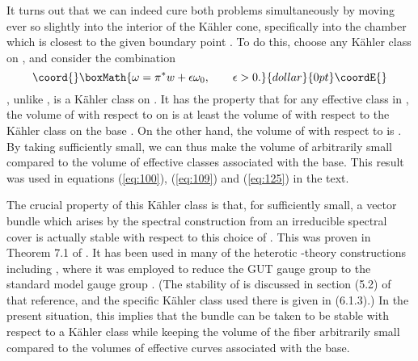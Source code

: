 \documentclass[a4paper,12pt]{article}
\numberwithin{equation}{section}
\theoremstyle{plain}
\begin{document}
It turns out that we can indeed cure both problems simultaneously by 
moving ever so slightly into the interior of the K\"{a}hler cone, specifically 
into the chamber which is closest to the 
given boundary point \coordHE{}. To do this,
choose any K\"{a}hler class \coordHE{} on \coordHE{}, and consider the combination 
$$\coord{}\boxMath{ \omega = {\pi}^*w + {\epsilon} \omega_0, \qquad {\epsilon} > 0. }{dollar}{0pt}\coordE{}$$  \myHighlight{$\omega$}\coordHE{}, unlike \coordHE{}, is a K\"{a}hler class on \coordHE{}. 
It has the property that for any
effective class \coordHE{} in \coordHE{}, the volume of 
\coordHE{} with respect to \myHighlight{$\omega$}\coordHE{} on \coordHE{} 
is at least the volume of \coordHE{} with respect to the
K\"{a}hler class \coordHE{} on the base \coordHE{}. On the other hand, the volume of \coordHE{} 
with respect to \myHighlight{$\omega$}\coordHE{} is \coordHE{}. 
By taking \myHighlight{$\epsilon$}\coordHE{}
sufficiently small, we can thus make the volume of \coordHE{} arbitrarily small
compared to the volume of effective classes associated with the base. This result
was used in equations (\ref{eq:100}), (\ref{eq:109}) and (\ref{eq:125}) in the
text.

The crucial property of this K\"{a}hler class \myHighlight{$\omega$}\coordHE{} is that, for
\myHighlight{$\epsilon$}\coordHE{} sufficiently small, a vector bundle \coordHE{} which arises by the spectral
construction from an irreducible spectral cover is actually stable with
respect to this choice of \myHighlight{$\omega$}\coordHE{}. This was proven in Theorem 7.1 of
\cite{FMW2}. It has been used in many of the heterotic \coordHE{}-theory constructions 
including \cite{RD3}, where it was employed to reduce the GUT gauge 
group \coordHE{} to the standard model gauge group \coordHE{}. (The stability 
of \coordHE{} is discussed in section (5.2) of that reference, and the specific 
K\"{a}hler class \myHighlight{$\omega$}\coordHE{} used there is given in (6.1.3).) 
In the present situation, this implies that the bundle \coordHE{} can be taken 
to be stable with respect to a K\"{a}hler class \myHighlight{$\omega$}\coordHE{} while keeping the volume
of the fiber \coordHE{} arbitrarily small compared to the volumes of effective curves
associated with the base.
\end{document}
